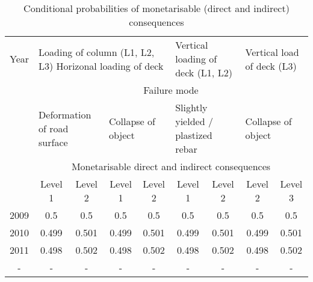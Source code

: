 \begin{table}
	\centering
	\caption{Conditional probabilities of monetarisable (direct and indirect) consequences} \label{tbleventfault:6}
\begin{tabular}{|l|l|l|l|l|l|l|l|l|}
\hline
\multicolumn{1}{|c|}{Year} & \multicolumn{4}{m{4.5cm}|}{\centering Loading of column (L1, L2, L3) Horizonal loading of deck} & \multicolumn{2}{m{2cm}|}{\centering Vertical loading of deck (L1, L2)} & \multicolumn{2}{m{2cm}|}{\centering Vertical load of deck (L3)} \\ 
\cline{2-9}
\multicolumn{1}{|c|}{} & \multicolumn{8}{c|}{Failure mode} \\ 
\cline{2-9}
\multicolumn{1}{|c|}{} & \multicolumn{2}{m{2cm}|}{\centering Deformation of road surface} & \multicolumn{2}{m{2cm}|}{\centering Collapse of object} & \multicolumn{2}{m{2cm}|}{\centering Slightly yielded / plastized rebar} & \multicolumn{2}{m{2cm}|}{\centering Collapse of object} \\ 
\cline{2-9}
\multicolumn{1}{|c|}{} & \multicolumn{8}{c|}{Monetarisable direct and indirect consequences} \\ 
\cline{2-9}
\multicolumn{1}{|c|}{} & \multicolumn{1}{c|}{Level 1} & \multicolumn{1}{c|}{Level 2} & \multicolumn{1}{c|}{Level 1} & \multicolumn{1}{c|}{Level 2} & \multicolumn{1}{c|}{Level 1} & \multicolumn{1}{c|}{Level 2} & \multicolumn{1}{c|}{Level 2} & \multicolumn{1}{c|}{Level 3} \\ 
\hline
\multicolumn{1}{|c|}{2009} & \multicolumn{1}{c|}{0.5} & \multicolumn{1}{c|}{0.5} & \multicolumn{1}{c|}{0.5} & \multicolumn{1}{c|}{0.5} & \multicolumn{1}{c|}{0.5} & \multicolumn{1}{c|}{0.5} & \multicolumn{1}{c|}{0.5} & \multicolumn{1}{c|}{0.5} \\ 
\hline
\multicolumn{1}{|c|}{2010} & \multicolumn{1}{c|}{0.499} & \multicolumn{1}{c|}{0.501} & \multicolumn{1}{c|}{0.499} & \multicolumn{1}{c|}{0.501} & \multicolumn{1}{c|}{0.499} & \multicolumn{1}{c|}{0.501} & \multicolumn{1}{c|}{0.499} & \multicolumn{1}{c|}{0.501} \\ 
\hline
\multicolumn{1}{|c|}{2011} & \multicolumn{1}{c|}{0.498} & \multicolumn{1}{c|}{0.502} & \multicolumn{1}{c|}{0.498} & \multicolumn{1}{c|}{0.502} & \multicolumn{1}{c|}{0.498} & \multicolumn{1}{c|}{0.502} & \multicolumn{1}{c|}{0.498} & \multicolumn{1}{c|}{0.502} \\ 
\hline
\multicolumn{1}{|c}{-} & \multicolumn{1}{c}{-} & \multicolumn{1}{c}{-} & \multicolumn{1}{c}{-} & \multicolumn{1}{c}{-} & \multicolumn{1}{c}{-} & \multicolumn{1}{c}{-} & \multicolumn{1}{c}{-} & \multicolumn{1}{c|}{-} \\ 

\end{tabular}
\end{table}
